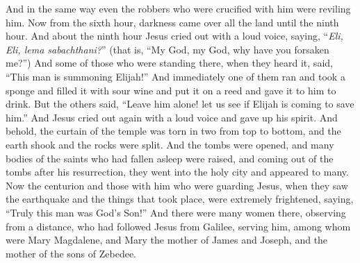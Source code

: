 \begin{biblechapter}
\verse And in the same way even the robbers who were crucified with him were reviling him.
 Now from the sixth hour, darkness came over all the land until the ninth hour.
\verse And about the ninth hour Jesus cried out with a loud voice, saying, “\textit{Eli, Eli, lema sabachthani?}” (that is, “My God, my God, why have you forsaken me?”)
\verse And some of those who were standing there, when they heard it, said, “This man is summoning Elijah!”
\verse And immediately one of them ran and took a sponge and filled it with sour wine and put it on a reed and gave it to him to drink.
\verse But the others said, “Leave him alone! let us see if Elijah is coming to save him.”
\verse And Jesus cried out again with a loud voice and gave up his spirit.
\verse And behold, the curtain of the temple was torn in two from top to bottom, and the earth shook and the rocks were split.
\verse And the tombs were opened, and many bodies of the saints who had fallen asleep were raised,
\verse and coming out of the tombs after his resurrection, they went into the holy city and appeared to many.
\verse Now the centurion and those with him who were guarding Jesus, when they saw the earthquake and the things that took place, were extremely frightened, saying, “Truly this man was God’s Son!”
\verse And there were many women there, observing from a distance, who had followed Jesus from Galilee, serving him,
\verse among whom were Mary Magdalene, and Mary the mother of James and Joseph, and the mother of the sons of Zebedee.

\end{biblechapter}
